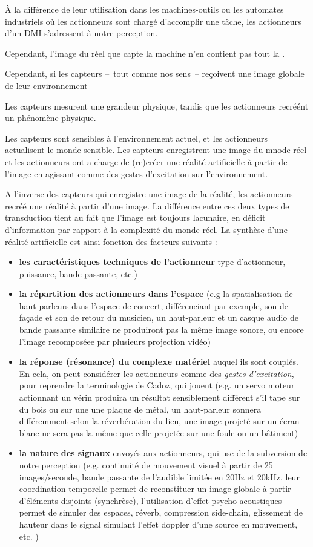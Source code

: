 À la différence de leur utilisation dans les machines-outils ou les automates industriels où les actionneurs sont chargé d'accomplir une tâche, les actionneurs d'un \gls{DMI} s'adressent à notre perception.

Cependant, l'image du réel que capte la machine n'en contient pas tout la .

Cependant, si les capteurs --~tout comme nos sens~-- reçoivent une image globale de leur environnement

Les capteurs mesurent une grandeur physique, tandis que les actionneurs recréént un phénomène physique.


Les capteurs sont sensibles à l'environnement actuel, et les actionneurs actualisent le monde sensible.
Les capteurs enregistrent une image du mnode réel et les actionneurs ont a charge de (re)créer une réalité artificielle à partir de l'image en agissant comme des gestes d'excitation sur l'environnement.

A l'inverse des capteurs qui enregistre une image de la réalité, les actionneurs recréé une réalité à partir d'une image.
La différence entre ces deux types de transduction tient au fait que l'image est toujours lacunaire, en déficit d'information par rapport à la complexité du monde réel. La synthèse d'une réalité artificielle est ainsi fonction des facteurs suivants :
\vspace{-1em}
\begin{itemize}[noitemsep]
	\item \textbf{les caractéristiques techniques de l'actionneur} type d'actionneur, puissance, bande passante, etc.)
	\item \textbf{la répartition des actionneurs dans l'espace} (e.g la spatialisation de haut-parleurs dans l'espace de concert, différenciant par exemple, son de façade et son de retour du musicien, un haut-parleur et un casque audio de bande passante similaire ne produiront pas la même image sonore, ou encore l'image recomposéee par plusieurs projection vidéo)
	\item \textbf{la réponse (résonance) du complexe matériel} auquel ils sont couplés. En cela, on peut considérer les actionneurs comme des \textit{gestes d'excitation}, pour reprendre la terminologie de Cadoz, qui jouent  (e.g. un servo moteur actionnant un vérin produira un résultat sensiblement différent s'il tape sur du bois ou sur une une plaque de métal, un haut-parleur sonnera différemment selon la réverbération du lieu, une image projeté sur un écran blanc ne sera pas la même que celle projetée sur une foule ou un bâtiment)
	\item \textbf{la nature des signaux} envoyés aux actionneurs, qui use de la subversion de notre perception (e.g. continuité de mouvement visuel à partir de 25 images/seconde, bande passante de l'audible limitée en 20Hz et 20kHz, leur coordination temporelle permet de reconstituer un image globale à partir d'éléments disjoints (synchrèse), l'utilisation d'effet psycho-acoustiques permet de simuler des espaces, réverb, compression side-chain, glissement de hauteur dans le signal simulant l'effet doppler d'une source en mouvement, etc. )
\end{itemize}

